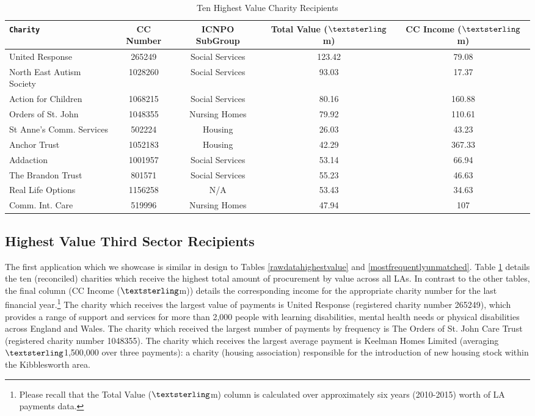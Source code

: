 \documentclass[12pt]{article}
\begin{document}
\begin{table}[!b]
\centering
\caption{Ten Highest Value Charity Recipients}
\begin{small}
\label{highestvaluecharity}
\begin{tabular}{lcccc}
\toprule
\texttt{Charity} & CC Number & ICNPO  SubGroup & Total Value ($\textsterling$m) & CC Income ($\textsterling$m) \\  \midrule
United Response & 265249 & Social Services & 123.42 & 79.08  \\
North East Autism Society & 1028260 & Social Services & 93.03 & 17.37\\
Action for Children & 1068215 & Social Services & 80.16 & 160.88\\
Orders of St. John & 1048355 & Nursing Homes & 79.92 & 110.61\\
St Anne's Comm. Services & 502224 & Housing & 26.03 & 43.23\\
Anchor Trust & 1052183 & Housing & 42.29 & 367.33\\
Addaction & 1001957 & Social Services & 53.14 & 66.94\\
The Brandon Trust & 801571 & Social Services & 55.23 & 46.63\\
Real Life Options & 1156258 & N/A & 53.43 & 34.63\\
Comm. Int. Care & 519996 & Nursing Homes & 47.94 & 107 \\ \bottomrule
\end{tabular}
\end{small}
\end{table}

\subsection{Highest Value Third Sector Recipients}

The first application which we showcase is similar in design to Tables \ref{rawdatahighestvalue} and \ref{mostfrequentlyunmatched}. Table \ref{highestvaluecharity} details the ten (reconciled) charities which receive the highest total amount of procurement by value across all LAs. In contrast to the other tables, the final column (CC Income ($\textsterling$m)) details the corresponding income for the appropriate charity number for the last financial year.\footnote{Please recall that the Total Value ($\textsterling$m) column is calculated over approximately six years (2010-2015) worth of LA payments data.} The charity which receives the largest value of payments is United Response (registered charity number 265249), which provides a range of support and services for more than 2,000 people with learning disabilities, mental health needs or physical disabilities across England and Wales. The charity which received the largest number of payments by frequency is The Orders of St. John Care Trust (registered charity number 1048355). The charity which receives the largest average payment is Keelman Homes Limited (averaging $\textsterling$1,500,000 over three payments): a charity (housing association) responsible for the introduction of new housing stock within the Kibblesworth area.
\end{document}
